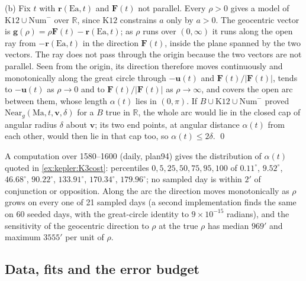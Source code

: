 (b) Fix $t$ with $\mathbf r(\mathrm{Ea},t)$ and $\mathbf F(t)$ not parallel. Every $\rho>0$ gives a model of $\mathrm{K12}\cup\mathrm{Num}^-$ over $\mathbb R$, since $\mathrm{K12}$ constrains $a$ only by $a>0$. The geocentric vector is $\mathbf g(\rho)=\rho\mathbf F(t)-\mathbf r(\mathrm{Ea},t)$; as $\rho$ runs over $(0,\infty)$ it runs along the open ray from $-\mathbf r(\mathrm{Ea},t)$ in the direction $\mathbf F(t)$, inside the plane spanned by the two vectors. The ray does not pass through the origin because the two vectors are not parallel. Seen from the origin, its direction therefore moves continuously and monotonically along the great circle through $-\mathbf u(t)$ and $\mathbf F(t)/\lvert\mathbf F(t)\rvert$, tends to $-\mathbf u(t)$ as $\rho\to0$ and to $\mathbf F(t)/\lvert\mathbf F(t)\rvert$ as $\rho\to\infty$, and covers the open arc between them, whose length $\alpha(t)$ lies in $(0,\pi)$. If $B\cup\mathrm{K12}\cup\mathrm{Num}^-$ proved $\mathrm{Near}_g(\mathrm{Ma},t,\mathbf v,\delta)$ for a $B$ true in $\mathbb R$, the whole arc would lie in the closed cap of angular radius $\delta$ about $\mathbf v$; its two end points, at angular distance $\alpha(t)$ from each other, would then lie in that cap too, so $\alpha(t)\le2\delta$. \qed

A computation over 1580--1600 (daily, plan94) gives the distribution of $\alpha(t)$ quoted in \cref{ex:kepler:K3cost}: percentiles $0,5,25,50,75,95,100$ of $0.11^\circ$, $9.52^\circ$, $46.68^\circ$, $90.22^\circ$, $133.91^\circ$, $170.34^\circ$, $179.96^\circ$; no sampled day is within $2'$ of conjunction or opposition. Along the arc the direction moves monotonically as $\rho$ grows on every one of 21 sampled days (a second implementation finds the same on 60 seeded days, with the great-circle identity to $9\times10^{-15}$ radians), and the sensitivity of the geocentric direction to $\rho$ at the true $\rho$ has median $969'$ and maximum $3555'$ per unit of $\rho$.

\subsection{Data, fits and the error budget}\label{sec:kepler:data}

